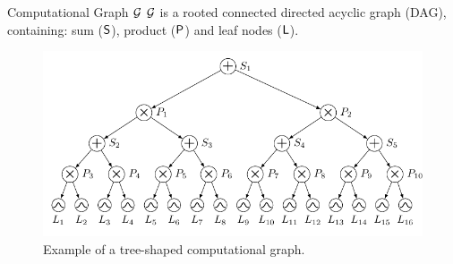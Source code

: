 \begin{frame}{Computational Graph $\mathcal{G}$}
 $\mathcal{G}$ is a rooted connected directed acyclic graph (DAG), containing: sum ($\mathsf{S}$), product ($\mathsf{P}$) and leaf nodes ($\mathsf{L}$).

\begin{figure}
  \includegraphics[width=\textwidth]{computation_graph}
  \caption{Example of a tree-shaped computational graph.}
\end{figure}
\end{frame}

